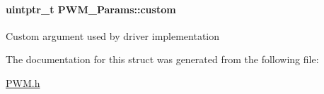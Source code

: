 \paragraph[{custom}]{\setlength{\rightskip}{0pt plus 5cm}uintptr\+\_\+t P\+W\+M\+\_\+\+Params\+::custom}\label{struct_p_w_m___params_aa0aeab9ee539a99c18e3208c87baf37a}
Custom argument used by driver implementation 

The documentation for this struct was generated from the following file\+:\begin{DoxyCompactItemize}
\item 
\hyperlink{_p_w_m_8h}{P\+W\+M.\+h}\end{DoxyCompactItemize}
